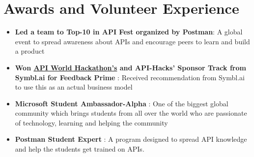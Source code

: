 \documentclass[letterpaper,11pt]{article}
\newcommand{\resumeItem}[1]{
  \item\small{
    {#1 \vspace{-2pt}}
  }
}
\newcommand{\resumeItemListStart}{\begin{itemize}}
\newcommand{\resumeItemListEnd}{\end{itemize}\vspace{-5pt}}
\begin{document}
\vspace{1pt}\section{\textbf{Awards and Volunteer Experience}}
 \begin{itemize}[leftmargin=0.15in, label={}]
    \small{\item{
        \resumeItemListStart
                \resumeItem{\textbf{Led a team to {Top-10 in API Fest} organized by Postman}: A global event to spread awareness about APIs and encourage peers to learn and build a product}
                \resumeItem{\textbf{{Won \href{https://devpost.com/software/feedback-prime-kbg8um}{API World Hackathon's} and {API-Hacks'} Sponsor Track from Symbl.ai for Feedback Prime} }: Received recommendation from Symbl.ai to use this as an actual business model}
                \resumeItem{\textbf{{Microsoft Student Ambassador-Alpha}} : One of the biggest global community which brings students from all over the world who are passionate of technology, learning and helping the community }
                \resumeItem{\textbf{{ Postman Student Expert}} : A program designed to spread API knowledge and help the students get trained on APIs.}
      \resumeItemListEnd
    }}
 \end{itemize}
 
 
\end{document}
